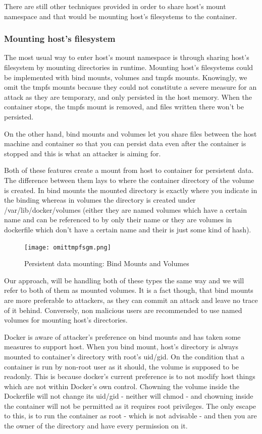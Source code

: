 There are still other techniques provided in order to share host's mount namespace and that would be mounting host's filesystems to the container.
\subsubsection{Mounting host's filesystem}
The most usual way to enter host's mount namespace is through sharing host's filesystem by mounting directories in runtime.
Mounting host's filesystems could be implemented with bind mounts, volumes and tmpfs mounts. Knowingly, we omit the tmpfs mounts because they could not constitute a severe measure for an attack as they are temporary, and only persisted in the host memory. When the container stops, the tmpfs mount is removed, and files written there won't be persisted. \cite{dockerdocsmount} 

On the other hand, bind mounts and volumes let you share files between the host machine and container so that you can persist data even after the container is stopped and this is what an attacker is aiming for.

Both of these features create a mount from host to container for persistent data. The difference between them lays to where the container directory of the volume is created. In bind mounts the mounted directory is exactly where you indicate in the binding whereas in volumes the directory is created under /var/lib/docker/volumes (either they are named volumes which have a certain name and can be referenced to by only their name or they are volumes in dockerfile which don't have a certain name and their  is just some kind of hash).

\begin{figure}[h!]
  \centering
   \texttt{[image: omittmpfsgm.png]}
   \caption{Persistent data mounting: Bind Mounts and Volumes}
\end{figure}

Our approach, will be handling both of these types the same way and we will refer to both of them as mounted volumes. It is a fact though, that bind mounts are more preferable to attackers, as they can commit an attack and leave no trace of it behind. Conversely, non malicious users are recommended to use named volumes for mounting host's directories.

Docker is aware of attacker's preference on bind mounts and has taken some measures to support host. When you bind mount, host's directory is always mounted to container's directory with root's uid/gid. On the condition that a container is run by non-root user as it should, the volume is supposed to be readonly. This is because docker's current preference is to not modify host things which are not within Docker's own control. Chowning the volume inside the Dockerfile will not change its uid/gid - neither will chmod - and chowning inside the container will not be permitted as it requires root privileges. The only escape to this, is to run the container as root - which is not advisable - and then you are the owner of the directory and have every permission on it.

